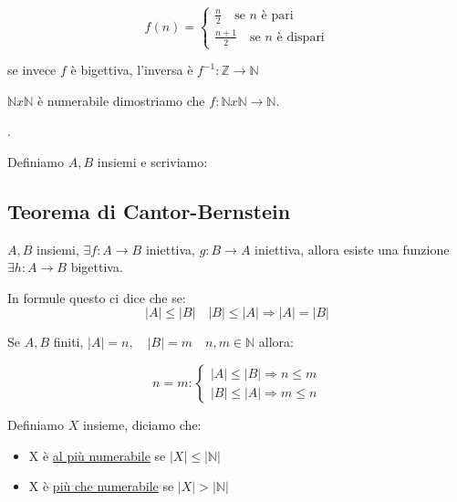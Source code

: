 \documentclass{article}
\theoremstyle{definition}
\begin{document}
\[
f(n) =
\begin{cases}
        \frac{n}{2} \quad \mbox{se $n$ è pari} \\
        \frac{n + 1}{2} \quad \mbox{se $n$ è dispari}
\end{cases}
\]

se invece $f$ è bigettiva, l'inversa è $f^{-1}: \mathbb{Z} \to \mathbb{N}$


$\mathbb{N} x \mathbb{N}$ è numerabile dimostriamo che $f: \mathbb{N} x \mathbb{N} \to \mathbb{N}$.

.

Definiamo $A,B$ insiemi e scriviamo: 



\subsection{Teorema di Cantor-Bernstein}
$A,B$ insiemi, $\exists f : A \to B$ iniettiva, $g: B \to A$ iniettiva, allora esiste una funzione $\exists h: A \to B$ bigettiva. \par
In formule questo ci dice che se:
\begin{equation}
        |A| \le |B| \quad |B| \le |A| \Rightarrow |A| = |B|
\end{equation} \newline

Se $A,B$ finiti, $|A| = n, \quad |B|= m \quad n,m \in \mathbb{N}$ allora: 

\[n=m :
\begin{cases}
        |A| \le |B| \Rightarrow n \le m \\
        |B| \le |A| \Rightarrow m \le n
\end{cases}
\]


Definiamo $X$ insieme, diciamo che:
\begin{itemize}
        \item X è \underline{al più numerabile} se $|X| \le |\mathbb{N}|$	
        \item X è \underline{più che numerabile} se $|X| > |\mathbb{N}|$
\end{itemize}
\end{document}
